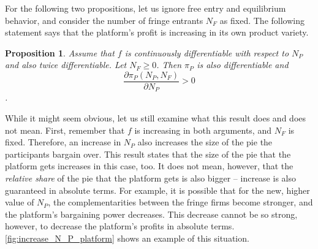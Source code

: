 \documentclass[a4paper]{article}
\newtheorem{proposition}{Proposition}
\begin{document}
For the following two propositions, let us ignore free entry and equilibrium behavior, and consider the number of fringe entrants $N_F$ as fixed.
The following statement says that the platform's profit is increasing in its own product variety.
\begin{proposition}
    \label{prop:share_of_platform}
    Assume that $f$ is continuously differentiable with respect to $N_P$ and also twice differentiable.
    Let $N_F \geq 0$.
    Then $\pi_P$ is also differentiable and
    $$\frac{\partial \pi_P(N_P, N_F)}{\partial N_P} > 0$$.
\end{proposition}
While it might seem obvious, let us still examine what this result does and does not mean.
First, remember that $f$ is increasing in both arguments, and $N_F$ is fixed.
Therefore, an increase in $N_P$ also increases the size of the pie the participants bargain over.
This result states that the size of the pie that the platform gets increases in this case, too.
It does not mean, however, that the \emph{relative share} of the pie that the platform gets is also bigger -- increase is also guaranteed in absolute terms.
For example, it is possible that for the new, higher value of $N_P$, the complementarities between the fringe firms become stronger, and the platform's bargaining power decreases.
This decrease cannot be so strong, however, to decrease the platform's profits in absolute terms.
\cref{fig:increase_N_P_platform} shows an example of this situation.
\end{document}
